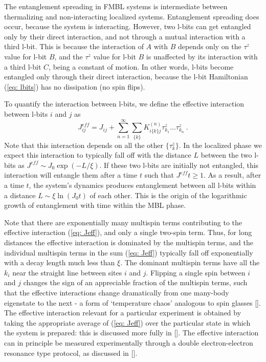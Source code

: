 \documentclass[amsmath,onecolumn, superscriptaddress,preprint,aps]{revtex4}
\renewcommand{\cite}[1]{[\onlinecite{#1}]}
\begin{document}
    The entanglement spreading in FMBL systems is intermediate between thermalizing and non-interacting localized systems.  Entanglement spreading does occur, because the system is interacting.  However, two l-bits can get entangled only by their direct interaction, and not through a mutual interaction with a third l-bit.  This is because the interaction of $A$ with $B$ depends only on the $\tau^z$ value for l-bit $B$, and the $\tau^z$ value for l-bit $B$ is unaffected by its interaction with a third l-bit $C$, being a constant of motion.  In other words, l-bits become entangled only through their direct interaction, because the l-bit Hamiltonian (\ref{eq: lbits}) has no dissipation (no spin flips).

 To quantify the interaction between l-bits, we define the effective interaction between l-bits $i$ and $j$ as
    \begin{equation}
  J^{eff}_{ij} =  J_{ij} + \sum_{n=1}^{\infty} \sum_{\{k\}} K^{(n)}_{i \{k\} j }  \tau^z_{k_1}...\tau^z_{k_n} ~. \label{eq: Jeff}
    \end{equation}
    Note that this interaction depends on all the other $\{\tau^z_k\}$.  In the localized phase we expect this interaction to typically fall off with the distance $L$ between the two l-bits as $J^{eff}\sim J_0\exp{(-L/\xi)}$.  If these two l-bits are initially not entangled, this interaction will entangle them after a time $t$ such that $J^{eff}t\ge 1$.  As a result, after a time $t$, the system's dynamics produces entanglement between all l-bits within a distance $L \sim \xi \ln (J_0t)$ of each other.  This is the origin of the logarithmic growth of entanglement with time within the MBL phase.

    Note that there are exponentially many multispin terms contributing to the effective interaction (\ref{eq: Jeff}), and only a single two-spin term.
    Thus, for long distances the effective interaction is dominated by the multispin terms, and the individual multispin terms in the sum
    (\ref{eq: Jeff}) typically fall off exponentially with a decay length much less than $\xi$.  The dominant multispin terms have all the $k_i$ near
    the straight line between sites $i$ and $j$.  Flipping a single spin between $i$ and $j$ changes the sign of an appreciable fraction of the multispin terms,
    such that the effective interactions change dramatically from one many-body eigenstate to the next - a form of `temperature chaos' analogous to spin glasses \cite{bm}.
    The effective interaction relevant for a particular experiment is obtained by taking the appropriate average of (\ref{eq: Jeff}) over the particular
    state in which the system is prepared: this is discussed more fully in \cite{Lbits2}.
    The effective interaction can in principle be measured experimentally through a double electron-electron resonance type protocol, as discussed in \cite{Serbynetal}.
\end{document}
